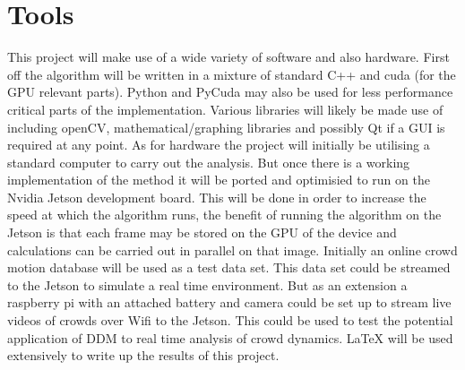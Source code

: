 \documentclass[11pt]{article}
\begin{document}

\section{Tools}
This project will make use of a wide variety of software and also hardware.
First off the algorithm will be written in a mixture of standard C++ and cuda (for the GPU relevant parts).
Python and PyCuda may also be used for less performance critical parts of the implementation.
Various libraries will likely be made use of including openCV, mathematical/graphing libraries and possibly Qt if a GUI is required at any point.
As for hardware the project will initially be utilising a standard computer to carry out the analysis.
But once there is a working implementation of the method it will be ported and optimisied to run on the Nvidia Jetson development board.
This will be done in order to increase the speed at which the algorithm runs, the benefit of running the algorithm on the Jetson
is that each frame may be stored on the GPU of the device and calculations can be carried out in parallel on that image.
Initially an online crowd motion database will be used as a test data set.\cite{crowdMotionDB}
This data set could be streamed to the Jetson to simulate a real time environment.
But as an extension a raspberry pi with an attached battery and camera could be set up to stream live videos of crowds over Wifi to the Jetson.
This could be used to test the potential application of DDM to real time analysis of crowd dynamics.
LaTeX will be used extensively to write up the results of this project.
\end{document}
